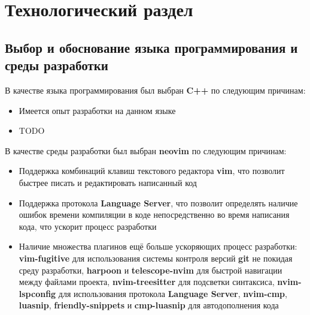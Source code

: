 \newpage
\section{Технологический раздел}

\subsection{Выбор и обоснование языка программирования и среды разработки}

В качестве языка программирования был выбран \textbf{C++} по следующим причинам:
\begin{itemize}
    \item Имеется опыт разработки на данном языке
    \item TODO
\end{itemize}

В качестве среды разработки был выбран \textbf{neovim} по следующим причинам:
\begin{itemize}
    \item Поддержка комбинаций клавиш текстового редактора \textbf{vim}, что
        позволит быстрее писать и редактировать написанный код
    \item Поддержка протокола \textbf{Language Server}, что позволит определять
        наличие ошибок времени компиляции в коде непосредственно во время
        написания кода, что ускорит процесс разработки
    \item Наличие множества плагинов ещё больше ускоряющих процесс разработки:
        \textbf{vim-fugitive} для использования системы контроля версий
        \textbf{git} не покидая среду разработки, \textbf{harpoon} и
        \textbf{telescope-nvim} для быстрой навигации между файлами проекта,
        \textbf{nvim-treesitter} для подсветки синтаксиса,
        \textbf{nvim-lspconfig} для использования протокола \textbf{Language
        Server}, \textbf{nvim-cmp}, \textbf{luasnip},
        \textbf{friendly-snippets} и \textbf{cmp-luasnip} для автодополнения
        кода
\end{itemize}

